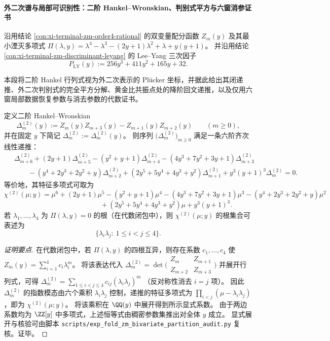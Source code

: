 \paragraph{外二次谱与局部可识别性：二阶 Hankel--Wronskian、判别式平方与六窗消参证书}
沿用结论 \ref{con:xi-terminal-zm-order4-rational} 的双变量配分函数 \(Z_m(y)\) 及其最小湮灭多项式
\(\Pi(\lambda,y)=\lambda^4-\lambda^3-(2y+1)\lambda^2+\lambda+y(y+1)\)。
并沿用结论 \ref{con:xi-terminal-zm-discriminant-leyang} 的 Lee--Yang 三次因子
\[
P_{\mathrm{LY}}(y):=256y^3+411y^2+165y+32.
\]
\par
本段将二阶 Hankel 行列式视为外二次表示的 Pl\"ucker 坐标，并据此给出其闭递推、外二次判别式的完全平方分解、黄金比共振点处的降阶回文递推，以及仅用六窗局部数据恢复参数与消去参数的代数证书。
\par

\begin{conclusion}\label{con:xi-terminal-zm-exterior-square-hankel-wronskian-order6}
定义二阶 Hankel--Wronskian
\[
\Delta^{(2)}_m(y):=Z_m(y)Z_{m+3}(y)-Z_{m+1}(y)Z_{m+2}(y)\qquad(m\ge 0),
\]
并在固定 \(y\) 下简记 \(\Delta^{(2)}_m:=\Delta^{(2)}_m(y)\)。
则序列 \(\bigl(\Delta^{(2)}_m\bigr)_{m\ge 0}\) 满足一条六阶齐次线性递推：
\[
\boxed{\;
\begin{aligned}
&\Delta^{(2)}_{m+6}+(2y+1)\Delta^{(2)}_{m+5}-(y^2+y+1)\Delta^{(2)}_{m+4}-(4y^3+7y^2+3y+1)\Delta^{(2)}_{m+3}\\
&\qquad-(y^4+2y^3+2y^2+y)\Delta^{(2)}_{m+2}+(2y^5+5y^4+4y^3+y^2)\Delta^{(2)}_{m+1}+y^3(y+1)^3\Delta^{(2)}_{m}=0.
\end{aligned}\;}
\]
等价地，其特征多项式可取为
\[
\chi^{(2)}(\mu;y)
=\mu^6+(2y+1)\mu^5-(y^2+y+1)\mu^4-(4y^3+7y^2+3y+1)\mu^3-(y^4+2y^3+2y^2+y)\mu^2
\]
\[
\qquad\qquad\qquad\qquad\qquad\quad
+(2y^5+5y^4+4y^3+y^2)\mu+y^3(y+1)^3.
\]
若 \(\lambda_1,\dots,\lambda_4\) 为 \(\Pi(\lambda,y)=0\) 的根（在代数闭包中），则 \(\chi^{(2)}(\mu;y)\) 的根集合可表述为
\[
\{\lambda_i\lambda_j:\ 1\le i<j\le 4\}.
\]
\end{conclusion}
\begin{proof}[证明要点]
在代数闭包中，若 \(\Pi(\lambda,y)\) 的四根互异，则存在系数 \(c_1,\dots,c_4\) 使
\(
Z_m(y)=\sum_{i=1}^4 c_i\lambda_i^m
\)。
将该表达代入
\(
\Delta^{(2)}_m
=\det\!\bigl(\begin{smallmatrix}Z_m&Z_{m+1}\\ Z_{m+2}&Z_{m+3}\end{smallmatrix}\bigr)
\)
并展开行列式，可得
\(
\Delta^{(2)}_m=\sum_{1\le i<j\le 4}c_{ij}(\lambda_i\lambda_j)^m
\)
（反对称性消去 \(i=j\) 项）。
因此 \(\Delta^{(2)}_m\) 的指数模态由六个乘积 \(\lambda_i\lambda_j\) 控制，递推的特征多项式为
\(
\prod_{i<j}(\mu-\lambda_i\lambda_j)
\)，即为 \(\chi^{(2)}(\mu;y)\)。
将该乘积在 \(\QQ(y)\) 中展开得到所示显式系数。
由于两边系数均为 \(\ZZ[y]\) 中多项式，上述恒等式由稠密参数集推出对全体 \(y\) 成立。
显式展开与核验可由脚本 \texttt{scripts/exp\_fold\_zm\_bivariate\_partition\_audit.py} 复核。证毕。
\end{proof}

